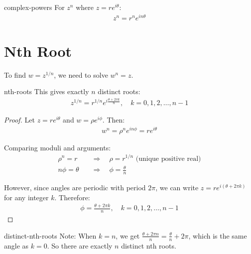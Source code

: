 \documentclass[12pt]{article}
\begin{document}
\begin{prop}{complex-powers}
For $z^n$ where $z = re^{i\theta}$:
\begin{align}
z^n = r^n e^{in\theta}
\end{align}
\end{prop}

\section{Nth Root}

To find $w = z^{1/n}$, we need to solve $w^n = z$.

\begin{prop}{nth-roots}
This gives exactly $n$ distinct roots:
\begin{align}
z^{1/n} = r^{1/n} e^{i\frac{\theta + 2\pi k}{n}}, \quad k = 0, 1, 2, \ldots, n-1
\end{align}
\end{prop}

\begin{proof}
Let $z = re^{i\theta}$ and $w = \rho e^{i\phi}$. Then:
\begin{align}
w^n = \rho^n e^{in\phi} = re^{i\theta}
\end{align}

Comparing moduli and arguments:
\begin{align}
\rho^n = r \quad &\Rightarrow \quad \rho = r^{1/n} \text{ (unique positive real)} \\
n\phi = \theta \quad &\Rightarrow \quad \phi = \frac{\theta}{n}
\end{align}

However, since angles are periodic with period $2\pi$, we can write $z = re^{i(\theta + 2\pi k)}$ for any integer $k$. Therefore:
\begin{align}
\phi = \frac{\theta + 2\pi k}{n}, \quad k = 0, 1, 2, \ldots, n-1
\end{align}
\end{proof}

\begin{rem}{distinct-nth-roots}
Note: When $k = n$, we get $\frac{\theta + 2\pi n}{n} = \frac{\theta}{n} + 2\pi$, which is the same angle as $k = 0$. So there are exactly $n$ distinct nth roots.
\end{rem}
\end{document}
